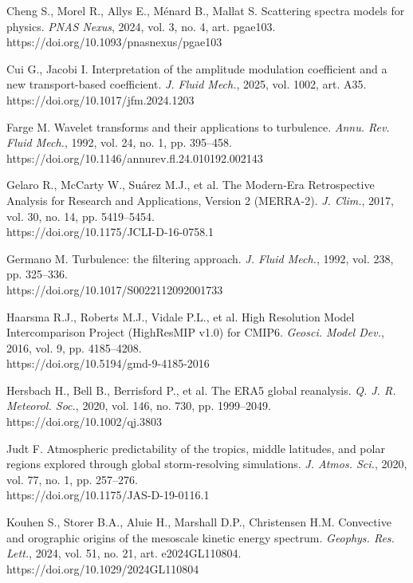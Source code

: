 \documentclass[12pt,a4paper]{article}
\begin{document}
\noindent Cheng S., Morel R., Allys E., Ménard B., Mallat S. Scattering spectra models for physics. \textit{PNAS Nexus}, 2024, vol. 3, no. 4, art. pgae103.\\ https://doi.org/10.1093/pnasnexus/pgae103

\noindent Cui G., Jacobi I. Interpretation of the amplitude modulation coefficient and a new transport-based coefficient. \textit{J. Fluid Mech.}, 2025, vol. 1002, art. A35.\\ https://doi.org/10.1017/jfm.2024.1203

\noindent Farge M. Wavelet transforms and their applications to turbulence. \textit{Annu. Rev. Fluid Mech.}, 1992, vol. 24, no. 1, pp. 395–458.\\ https://doi.org/10.1146/annurev.fl.24.010192.002143

\noindent Gelaro R., McCarty W., Suárez M.J., et al. The Modern-Era Retrospective Analysis for Research and Applications, Version 2 (MERRA-2). \textit{J. Clim.}, 2017, vol. 30, no. 14, pp. 5419–5454.\\ https://doi.org/10.1175/JCLI-D-16-0758.1

\noindent Germano M. Turbulence: the filtering approach. \textit{J. Fluid Mech.}, 1992, vol. 238, pp. 325–336.\\ https://doi.org/10.1017/S0022112092001733

\noindent Haarsma R.J., Roberts M.J., Vidale P.L., et al. High Resolution Model Intercomparison Project (HighResMIP v1.0) for CMIP6. \textit{Geosci. Model Dev.}, 2016, vol. 9, pp. 4185–4208.\\ https://doi.org/10.5194/gmd-9-4185-2016

\noindent Hersbach H., Bell B., Berrisford P., et al. The ERA5 global reanalysis. \textit{Q. J. R. Meteorol. Soc.}, 2020, vol. 146, no. 730, pp. 1999–2049.\\ https://doi.org/10.1002/qj.3803

\noindent Judt F. Atmospheric predictability of the tropics, middle latitudes, and polar regions explored through global storm-resolving simulations. \textit{J. Atmos. Sci.}, 2020, vol. 77, no. 1, pp. 257–276.\\ https://doi.org/10.1175/JAS-D-19-0116.1

\noindent Kouhen S., Storer B.A., Aluie H., Marshall D.P., Christensen H.M. Convective and orographic origins of the mesoscale kinetic energy spectrum. \textit{Geophys. Res. Lett.}, 2024, vol. 51, no. 21, art. e2024GL110804.\\ https://doi.org/10.1029/2024GL110804
\end{document}
